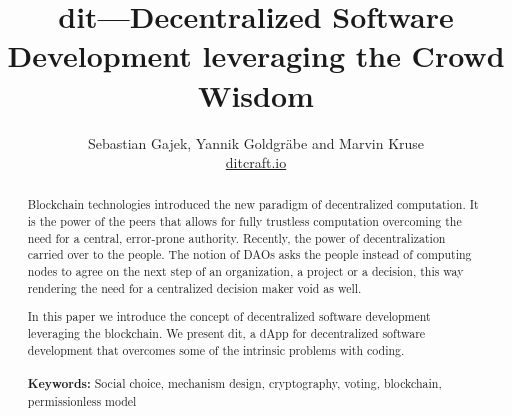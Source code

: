 \documentclass[12pt]{article}
\begin{document}
\title{dit---Decentralized Software Development leveraging the Crowd Wisdom}
\author{Sebastian Gajek, Yannik Goldgräbe and Marvin Kruse\\\url{ditcraft.io}}
\maketitle

\begin{abstract}
Blockchain technologies introduced the new paradigm of decentralized computation. It is the power of the peers that allows for fully trustless computation overcoming the need for a central, error-prone authority. Recently, the power of decentralization carried over to the people. The notion of DAOs asks the people instead of computing nodes to agree on the next step of an organization, a project or a decision, this way rendering the need for a centralized decision maker void as well.

In this paper we introduce the concept of decentralized software development leveraging the blockchain. We present dit, a dApp for decentralized software development that overcomes some of the intrinsic problems with coding.
\\
\\\textbf{Keywords: } Social choice, mechanism design, cryptography, voting, blockchain, permissionless model
\end{abstract}




\end{document}
